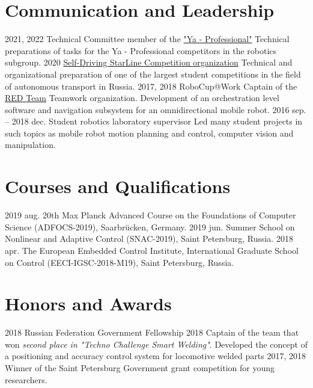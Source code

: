 \documentclass{ncv}
\begin{document}
\section{Communication and Leadership}
\begin{two_col_entry_list}
    \entryhc
        {2021, 2022}
		{Technical Committee member of the \textcolor{MidnightBlue}{\href{https://yandex.ru/profi/}{"Ya - Professional"}}}
		{}
		{Technical preparations of tasks for the Ya - Professional competitors in the robotics subgroup.}
    \entryhc
		{2020}
		{\textcolor{MidnightBlue}{\href{https://robofinist.ru/event/info/media/id/339}{Self-Driving StarLine Competition organization}}}
		{}
		{Technical and organizational preparation of one of the largest student competitions in the field of autonomous transport in Russia.}
    \entryhc
		{2017, 2018}
		{RoboCup@Work Captain of the \textcolor{MidnightBlue}{\href{https://red-itmo.github.io/}{RED Team}}}
		{}
		{Teamwork organization. Development of an orchestration level software and navigation subsystem for an omnidirectional mobile robot.}
    \entryhc
		{2016 sep. -- 2018 dec.}
		{Student robotics laboratory supervisor}
		{}
		{Led many student projects in such topics as mobile robot motion planning and control, computer vision and manipulation.}
\end{two_col_entry_list}


\section{Courses and Qualifications}
\begin{two_col_entry_list}
    \entryc
		{2019 aug.}
		{20th Max Planck Advanced Course on the Foundations of Computer Science (ADFOCS-2019), Saarbrücken, Germany.}
    \entryc
		{2019 jun.}
		{Summer School on Nonlinear and Adaptive Control (SNAC-2019), Saint Petersburg, Russia.  }
    \entryc
		{2018 apr.}
		{The European Embedded Control Institute, International Graduate School on Control (EECI-IGSC-2018-M19), Saint Petersburg, Russia. }
\end{two_col_entry_list}

\section{Honors and Awards}
\begin{two_col_entry_list}
    \entryc
		{2018}
		{Russian Federation Government Fellowship}
	\entryc
		{2018}
		{Captain of the team that won \textit{second place in "Techno Challenge Smart Welding"}. Developed the concept of a positioning and accuracy control system for locomotive welded parts}
    \entryc
		{2017, 2018}
		{Winner of the Saint Petersburg Government grant competition for
young researchers.}

\end{two_col_entry_list}
\end{document}
